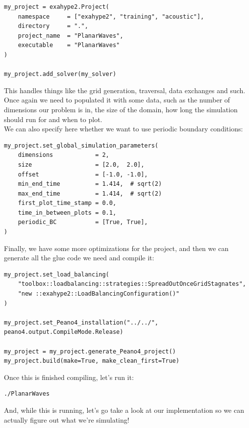 \documentclass[12pt,letterpaper]{article}
\begin{document}
\begin{lstlisting}[style = Python]
my_project = exahype2.Project(
    namespace     = ["exahype2", "training", "acoustic"],
    directory     = ".",
    project_name  = "PlanarWaves",
    executable    = "PlanarWaves"
)

my_project.add_solver(my_solver)
\end{lstlisting}

This handles things like the grid generation, traversal, data exchanges and such.
Once again we need to populated it with some data, such as the number of dimensions our problem is in,
the size of the domain, how long the simulation should run for and when to plot.\\

We can also specify here whether we want to use periodic boundary conditions:\\

\begin{lstlisting}[style = Python]
my_project.set_global_simulation_parameters(
    dimensions            = 2,
    size                  = [2.0,  2.0],
    offset                = [-1.0, -1.0],
    min_end_time          = 1.414,  # sqrt(2)
    max_end_time          = 1.414,  # sqrt(2)
    first_plot_time_stamp = 0.0,
    time_in_between_plots = 0.1,
    periodic_BC           = [True, True],
)
\end{lstlisting}

Finally, we have some more optimizations for the project, and then we can generate all the glue code we need and compile it:\\

\begin{lstlisting}[style = Python]
my_project.set_load_balancing(
    "toolbox::loadbalancing::strategies::SpreadOutOnceGridStagnates",
    "new ::exahype2::LoadBalancingConfiguration()"
)

my_project.set_Peano4_installation("../../", peano4.output.CompileMode.Release)

my_project = my_project.generate_Peano4_project()
my_project.build(make=True, make_clean_first=True)
\end{lstlisting}

Once this is finished compiling, let's run it:\\

\begin{lstlisting}[style = Bash]
./PlanarWaves
\end{lstlisting}

And, while this is running, let's go take a look at our implementation so we can actually figure out what we're simulating!
\end{document}
